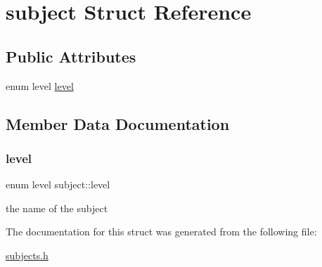 \hypertarget{structsubject}{}\section{subject Struct Reference}
\label{structsubject}
\subsection*{Public Attributes}
\begin{DoxyCompactItemize}
\item 
enum level \hyperlink{structsubject_a59bfabba13591d841473e9097b309234}{level}
\end{DoxyCompactItemize}


\subsection{Member Data Documentation}
\mbox{\label{structsubject_a59bfabba13591d841473e9097b309234}} 
\subsubsection{\texorpdfstring{level}{level}}
{\footnotesize\ttfamily enum level subject\+::level}

the name of the subject 

The documentation for this struct was generated from the following file\+:\begin{DoxyCompactItemize}
\item 
\hyperlink{subjects_8h}{subjects.\+h}\end{DoxyCompactItemize}
